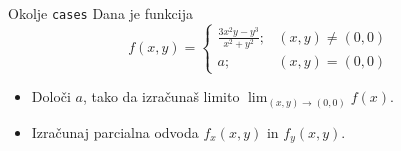\begin{frame}{Okolje \texttt{cases}}
	Dana je funkcija
	$$
	f(x,y) = \begin{cases}
		\frac{3x^2y-y^3}{x^2+y^2}; & (x,y) \neq (0,0) \\
		a; & (x,y)=(0,0)
	\end{cases}
	$$	
	\begin{itemize}
	\item Določi $a$, tako da izračunaš limito \( \lim_{(x,y)\to(0,0)} f(x). \)
	\item Izračunaj parcialna odvoda $f_x(x,y)$ in $f_y(x,y)$.
	\end{itemize}
\end{frame}
